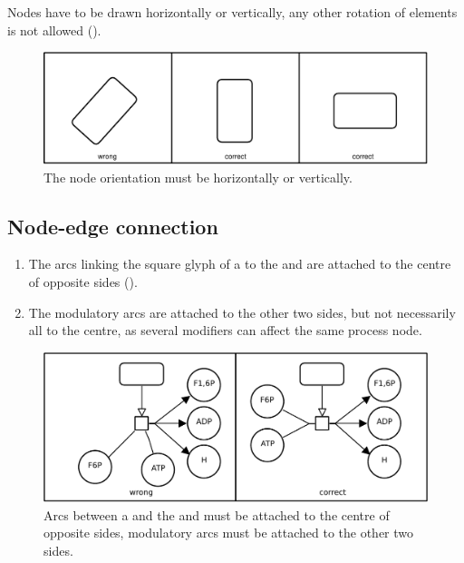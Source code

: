 Nodes have to be drawn horizontally or vertically, any other
rotation of elements is not allowed ().

\begin{figure}[htb]
  \centering
  \includegraphics[scale=0.8]{images/build/layout_orientation.pdf}
  \caption{The node orientation must be horizontally or
  vertically.}\label{fig:layout5}
\end{figure}

\subsection{Node-edge connection}

\begin{enumerate}
\item The arcs linking the square glyph of a  to the  and 
 are attached to the centre of opposite sides ().
\item The modulatory arcs are attached to the other two sides, but not necessarily all to the centre, as several modifiers can affect the same process node.
\end{enumerate}

\begin{figure}[htb]
  \centering
  \includegraphics[scale=0.8]{images/build/layout_connecting_arcs.pdf}
  \caption{Arcs between a   and the  and  must be attached to the centre of opposite sides, modulatory
  arcs must be attached to the other two sides.}\label{fig:layout6}
\end{figure}


